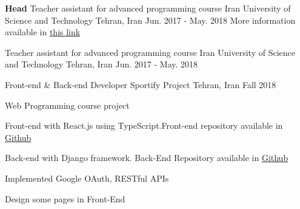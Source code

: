 

\begin{cventries}

  \cventry
  {\textbf{Head} Teacher assistant for advanced programming course} %
  {Iran University of Science and Technology} %
  {Tehran, Iran} %
  {Jun. 2017 - May. 2018} %
  {More information available in \textcolor{blue}{\href{https://sauleh.github.io/ap97/}{this link}}}

  \cventry
  {Teacher assistant for advanced programming course} %
  {Iran University of Science and Technology} %
  {Tehran, Iran} %
  {Jun. 2017 - May. 2018} %
  {}

  \cventry
  {Front-end \& Back-end Developer} %
  {Sportify Project} %
  {Tehran, Iran} %
  {Fall 2018} %
  {
    \begin{cvitems} %
      \item {Web Programming course project}
      \item {Front-end with React.js using TypeScript.Front-end repository available in \href{https://github.com/ali4heydari/sportify-frontend}{Github}}
      \item {Back-end with Django framework. Back-End Repository available in \href{https://github.com/ali4heydari/sportify-backend}{Github}}
      \item {Implemented Google OAuth, RESTful APIs}
      \item {Design some pages in Front-End}
    \end{cvitems}
  }
  


\end{cventries}
